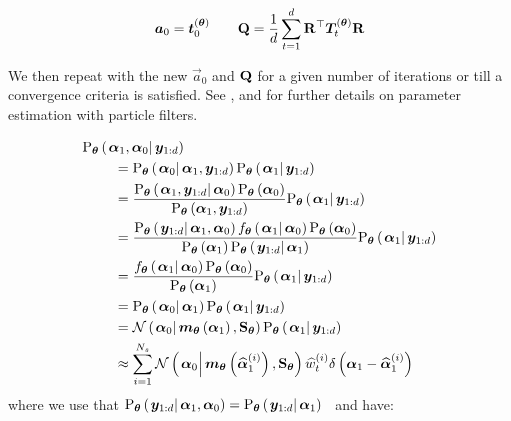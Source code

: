 \begin{equation}
\vec{a}_0 = \vec{t}_0^{(\vec{\theta})} \qquad
%
\mat{Q} = \frac{1}{d}\sum_{t = 1}^d \mat{R}^\top\vec{T}_t^{(\vec{\theta})}\mat{R}
\end{equation}

We then repeat with the new $\vec{a}_0$ and $\mathbf{Q}$ for a given number of iterations or till a convergence criteria is satisfied.  See \cite{kantas15}, \cite{del10} and \cite{schon11} for further details on parameter estimation with particle filters.

\begin{equation}\begin{split}
\optorC{\Prob_{\vec{\theta}}}{\vec{\alpha}_1, \vec{\alpha}_0}{\vec{y}_{1:d}} \hspace{-50pt} & \\
%
& = \optorC{\Prob_{\vec{\theta}}}{\vec{\alpha}_0}{\vec{\alpha}_1, \vec{y}_{1:d}}
	\optorC{\Prob_{\vec{\theta}}}{\vec{\alpha}_1}{\vec{y}_{1:d}} \\
%
& = \frac{
		\optorC{\Prob_{\vec{\theta}}}{\vec{\alpha}_1, \vec{y}_{1:d}}{\vec{\alpha}_0}
		\optor{\Prob_{\vec{\theta}}}{\vec{\alpha}_0}
	}{ %
		\optor{\Prob_{\vec{\theta}}}{\vec{\alpha}_1, \vec{y}_{1:d}}
	} %
	\optorC{\Prob_{\vec{\theta}}}{\vec{\alpha}_1}{\vec{y}_{1:d}} \\
%
& = \frac{
		\optorC{\Prob_{\vec{\theta}}}{\vec{y}_{1:d}}{\vec{\alpha}_1, \vec{\alpha}_0}
		\optorC{f_{\vec{\theta}}}{\vec{\alpha}_1}{\vec{\alpha}_0}
		\optor{\Prob_{\vec{\theta}}}{\vec{\alpha}_0}
	}{ %
		\optor{\Prob_{\vec{\theta}}}{\vec{\alpha}_1}
		\optorC{\Prob_{\vec{\theta}}}{\vec{y}_{1:d}}{\vec{\alpha}_1}
	} %
	\optorC{\Prob_{\vec{\theta}}}{\vec{\alpha}_1}{\vec{y}_{1:d}} \\
%
& = \frac{
		\optorC{f_{\vec{\theta}}}{\vec{\alpha}_1}{\vec{\alpha}_0}
		\optor{\Prob_{\vec{\theta}}}{\vec{\alpha}_0}
	}{ %
		\optor{\Prob_{\vec{\theta}}}{\vec{\alpha}_1}
	} %
	\optorC{\Prob_{\vec{\theta}}}{\vec{\alpha}_1}{\vec{y}_{1:d}} \\
%
& = \optorC{\Prob_{\vec{\theta}}}{\vec{\alpha}_0}{\vec{\alpha}_1}
	\optorC{\Prob_{\vec{\theta}}}{\vec{\alpha}_1}{\vec{y}_{1:d}} \\
%
& = \normalC{\vec{\alpha}_0}{
		\optor{\vec{m}_{\vec{\theta}}}{\vec{\alpha}_1}
	}{ %
		\mat{S}_{\vec{\theta}}
	}
	\optorC{\Prob_{\vec{\theta}}}{\vec{\alpha}_1}{\vec{y}_{1:d}} \\
%
& \approx \sum_{i=1}^{N_s}
	\normalC{\vec{\alpha}_0}{
		\optor{\vec{m}_{\vec{\theta}}}{\particS{\vec{\alpha}}{1}{i}}
	}{ %
		\mat{S}_{\vec{\theta}}
	}
	\particS{w}{t}{i}\dirac{\vec{\alpha}_1 - \particS{\vec{\alpha}}{1}{i}}
\end{split}\end{equation} %
%
% 
where we use that %
$\optorC{\Prob_{\vec{\theta}}}{\vec{y}_{1:d}}{\vec{\alpha}_1, \vec{\alpha}_0} = \optorC{\Prob_{\vec{\theta}}}{\vec{y}_{1:d}}{\vec{\alpha}_1}$%
~and have:


